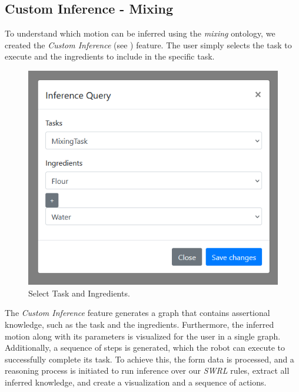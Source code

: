 \subsection{Custom Inference - Mixing}
To understand which motion can be inferred using the \textit{mixing} ontology, we created
the \textit{Custom Inference} (see ) feature. The user simply selects the task to 
execute and the ingredients to include in the specific task. 
\begin{figure}[H]
    \centering
    \includegraphics[scale=0.45]{Graphics/inference_user_input.png}
    \caption{Select Task and Ingredients.}
\end{figure}
The \textit{Custom Inference} feature generates a graph that contains assertional knowledge, such as the task and the ingredients. 
Furthermore, the inferred motion along with its parameters is visualized for the user in a single graph. 
Additionally, a sequence of steps is generated, which the robot can execute to successfully complete its task. 
To achieve this, the form data is processed, and a reasoning process is initiated to run inference over our \textit{SWRL} rules, extract all inferred knowledge, 
and create a visualization and a sequence of actions.

